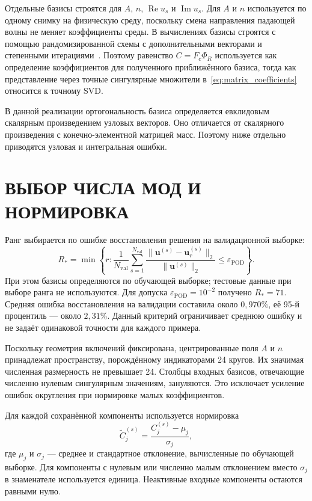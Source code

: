 \documentclass[notitle]{sibjima_preview}
\begin{document}
Отдельные базисы строятся для \(A\), \(n\), \(\operatorname{Re}u_s\) и \(\operatorname{Im}u_s\). Для \(A\) и \(n\) используется по одному снимку на физическую среду, поскольку смена направления падающей волны не меняет коэффициенты среды. В вычислениях базисы строятся с помощью рандомизированной схемы с дополнительными векторами и степенными итерациями~\cite{halko2011}. Поэтому равенство \(C=F_c\Phi_R\) используется как определение коэффициентов для полученного приближённого базиса, тогда как представление через точные сингулярные множители в~\eqref{eq:matrix_coefficients} относится к точному SVD.

В данной реализации ортогональность базиса определяется евклидовым скалярным произведением узловых векторов. Оно отличается от скалярного произведения с конечно-элементной матрицей масс. Поэтому ниже отдельно приводятся узловая и интегральная ошибки.

\section{ВЫБОР ЧИСЛА МОД И НОРМИРОВКА}
Ранг выбирается по ошибке восстановления решения на валидационной выборке:
\begin{equation*}
R_*=\min\left\{r:
\frac{1}{N_{\mathrm{val}}}\sum_{s=1}^{N_{\mathrm{val}}}
\frac{\|\bm{u}^{(s)}-\bm{u}_r^{(s)}\|_2}
{\|\bm{u}^{(s)}\|_2}
\leq\varepsilon_{\mathrm{POD}}\right\}.
\end{equation*}
При этом базисы определяются по обучающей выборке; тестовые данные при выборе ранга не используются. Для допуска \(\varepsilon_{\mathrm{POD}}=10^{-2}\) получено \(R_*=71\). Средняя ошибка восстановления на валидации составила около \(0{,}970\%\), её 95-й процентиль --- около \(2{,}31\%\). Данный критерий ограничивает среднюю ошибку и не задаёт одинаковой точности для каждого примера.

Поскольку геометрия включений фиксирована, центрированные поля \(A\) и \(n\) принадлежат пространству, порождённому индикаторами 24 кругов. Их значимая численная размерность не превышает 24. Столбцы входных базисов, отвечающие численно нулевым сингулярным значениям, зануляются. Это исключает усиление ошибок округления при нормировке малых коэффициентов.

Для каждой сохранённой компоненты используется нормировка
\begin{equation*}
\widetilde C_j^{(s)}
=\frac{C_j^{(s)}-\mu_j}{\sigma_j},
\end{equation*}
где \(\mu_j\) и \(\sigma_j\) --- среднее и стандартное отклонение, вычисленные по обучающей выборке. Для компоненты с нулевым или численно малым отклонением вместо \(\sigma_j\) в знаменателе используется единица. Неактивные входные компоненты остаются равными нулю.
\end{document}
